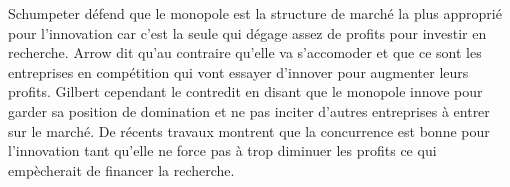 Schumpeter défend que le monopole est la structure de marché la plus approprié pour l'innovation car c'est la seule qui dégage assez de profits pour investir en recherche. Arrow dit qu'au contraire qu'elle va s'accomoder et que ce sont les entreprises en compétition qui vont essayer d'innover pour augmenter leurs profits. Gilbert cependant le contredit en disant que le monopole innove pour garder sa position de domination et ne pas inciter d'autres entreprises à entrer sur le marché. De récents travaux montrent que la concurrence est bonne pour l'innovation tant qu'elle ne force pas à trop diminuer les profits ce qui empècherait de financer la recherche.






